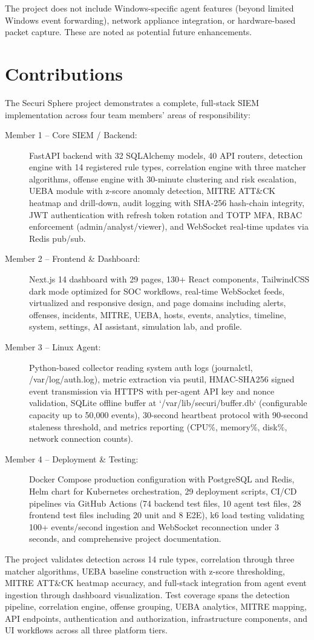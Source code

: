 The project does not include Windows-specific agent features (beyond limited Windows event forwarding), network appliance integration, or hardware-based packet capture. These are noted as potential future enhancements.

\section{Contributions}

The Securi Sphere project demonstrates a complete, full-stack SIEM implementation across four team members' areas of responsibility:

\begin{description}
    \item[Member 1 -- Core SIEM / Backend:] FastAPI backend with 32 SQLAlchemy models, 40 API routers, detection engine with 14 registered rule types, correlation engine with three matcher algorithms, offense engine with 30-minute clustering and risk escalation, UEBA module with z-score anomaly detection, MITRE ATT\&CK heatmap and drill-down, audit logging with SHA-256 hash-chain integrity, JWT authentication with refresh token rotation and TOTP MFA, RBAC enforcement (admin/analyst/viewer), and WebSocket real-time updates via Redis pub/sub.
    \item[Member 2 -- Frontend \& Dashboard:] Next.js 14 dashboard with 29 pages, 130+ React components, TailwindCSS dark mode optimized for SOC workflows, real-time WebSocket feeds, virtualized and responsive design, and page domains including alerts, offenses, incidents, MITRE, UEBA, hosts, events, analytics, timeline, system, settings, AI assistant, simulation lab, and profile.
    \item[Member 3 -- Linux Agent:] Python-based collector reading system auth logs (journalctl, /var/log/auth.log), metric extraction via psutil, HMAC-SHA256 signed event transmission via HTTPS with per-agent API key and nonce validation, SQLite offline buffer at `/var/lib/securi/buffer.db` (configurable capacity up to 50,000 events), 30-second heartbeat protocol with 90-second staleness threshold, and metrics reporting (CPU\%, memory\%, disk\%, network connection counts).
    \item[Member 4 -- Deployment \& Testing:] Docker Compose production configuration with PostgreSQL and Redis, Helm chart for Kubernetes orchestration, 29 deployment scripts, CI/CD pipelines via GitHub Actions (74 backend test files, 10 agent test files, 28 frontend test files including 20 unit and 8 E2E), k6 load testing validating 100+ events/second ingestion and WebSocket reconnection under 3 seconds, and comprehensive project documentation.
\end{description}

The project validates detection across 14 rule types, correlation through three matcher algorithms, UEBA baseline construction with z-score thresholding, MITRE ATT\&CK heatmap accuracy, and full-stack integration from agent event ingestion through dashboard visualization. Test coverage spans the detection pipeline, correlation engine, offense grouping, UEBA analytics, MITRE mapping, API endpoints, authentication and authorization, infrastructure components, and UI workflows across all three platform tiers.